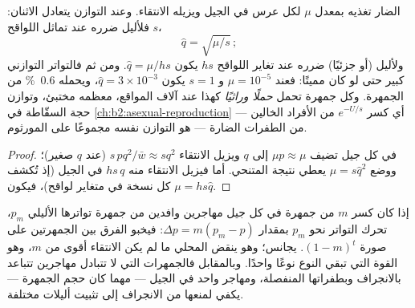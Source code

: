 \begin{theorem}\label{thm:b2:population-genetics:balance}
 الضار تغذيه  بمعدل $\mu$ لكل عرس
في الجيل ويزيله الانتقاء. وعند التوازن يتعادل
الاثنان: فلأليل  ضرره عند تماثل اللواقح $s$،
\[
\hat q = \sqrt{\mu/s}\,;
\]
ولأليل  (أو  جزئيًا) ضرره عند تغاير اللواقح
$hs$ يكون $\hat q = \mu/hs$. ومن ثم فالتواتر التوازني
 كبير حتى لو كان مميتًا: فعند $\mu = 10^{-5}$ و
$s = 1$ يكون $\hat q = 3\times 10^{-3}$، ويحمله \qty{0.6}{\%} من الجمهرة.
وكل جمهرة تحمل \emph{حملًا وراثيًا} كهذا عند
آلاف المواقع، معظمه  مختبئ، وتوازن
حجة السقّاطة في \cref{ch:b2:asexual-reproduction}
--- أي كسر $e^{-U/s}$ من الأفراد الخالين من الطفرات
الضارة --- هو التوازن نفسه مجموعًا على المورثوم.
\end{theorem}
\begin{proof}
في كل جيل تضيف  $\mu p \approx \mu$ إلى $q$ ويزيل
الانتقاء $s\,pq^{2}/\bar w \approx sq^{2}$ (عند $q$ صغير)؛
ووضع $\mu = s\hat q^{2}$ يعطي نتيجة المتنحي. أما 
 فيزيل الانتقاء منه $hs\,q$ في الجيل (إذ تُكشف كل نسخة
في متغاير لواقح)، فيكون $\mu = hs\hat q$.
\end{proof}

\begin{proposition}\label{prop:b2:population-genetics:migration}
إذا كان كسر $m$ من جمهرة في كل جيل مهاجرين وافدين
من جمهرة تواترها الأليلي $p_{m}$، تحرك التواتر
نحو $p_{m}$ بمقدار $\Delta p = m(p_{m} - p)$: فيخبو الفرق
بين الجمهرتين على صورة $(1 - m)^{t}$. \emph{} يجانس؛ وهو ينقض  المحلي ما لم يكن الانتقاء
أقوى من $m$، وهو القوة التي تبقي النوع نوعًا
واحدًا. وبالمقابل فالجمهرات التي لا تتبادل مهاجرين تتباعد
بالانجراف وبطفراتها المنفصلة، ومهاجر واحد في
الجيل --- مهما كان حجم الجمهرة --- يكفي لمنعها
من الانجراف إلى تثبيت أليلات مختلفة.
\end{proposition}

